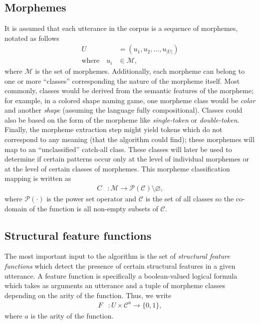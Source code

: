 \subsection{Morphemes}
It is assumed that each utterance in the corpus is a sequence of morphemes, notated as follows
\begin{align}
  U &= (u_1, u_2, \dots, u_{|U|}) \\
  \text{where}\quad u_i &\in \mathcal M
  ,
\end{align}
where $\mathcal M$ is the set of morphemes.
Additionally, each morpheme can belong to one or more ``classes'' corresponding the nature of the morpheme itself.
Most commonly, classes would be derived from the semantic features of the morpheme;
  for example, in a colored shape naming game, one morpheme class would be \emph{color} and another \emph{shape} (assuming the language fully compositional).
Classes could also be based on the form of the morpheme like \emph{single-token} or \emph{double-token}.
Finally, the morpheme extraction step might yield tokens which do not correspond to any meaning (that the algorithm could find); these morphemes will map to an ``unclassified'' catch-all class.
These classes will later be used to determine if certain patterns occur only at the level of individual morphemes or at the level of certain classes of morphemes.
This morpheme classification mapping is written as
\begin{align}
  C &: \mathcal M \rightarrow \mathcal P(\mathcal C) \setminus \varnothing
  ,
\end{align}
where $\mathcal P(\cdot)$ is the power set operator and $\mathcal C$ is the set of all classes so the co-domain of the function is all non-empty subsets of $\mathcal C$.


\subsection{Structural feature functions}

The most important input to the algorithm is the set of \emph{structural feature functions} which detect the presence of certain structural features in a given utterance.
A feature function is specifically a boolean-valued logical formula which takes as arguments an utterance and a tuple of morpheme classes depending on the arity of the function.
Thus, we write
\begin{align}
  F &: U \times \mathcal C^a \rightarrow \{0,1\}
  ,
\end{align}
where $a$ is the arity of the function.

